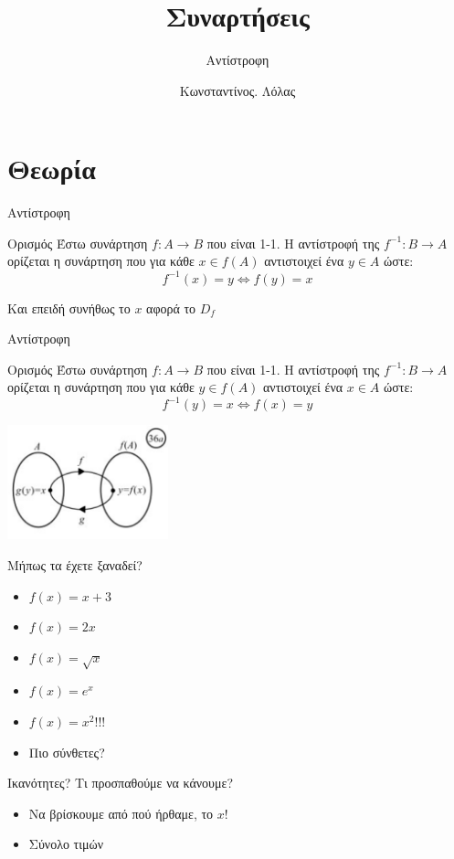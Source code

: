 \documentclass[greek]{beamer}
\title{Συναρτήσεις}
\subtitle{Αντίστροφη}
\author[Λόλας]{Κωνσταντίνος. Λόλας}
\date{}
\begin{document}
\begin{frame}
 \titlepage
\end{frame}

\section{Θεωρία}
\begin{frame}{Αντίστροφη}
 \begin{block}{Ορισμός}
  Έστω συνάρτηση  $f:Α\to B$ που είναι 1-1. Η αντίστροφή της $f^{-1}:Β\to Α$ ορίζεται η συνάρτηση που για κάθε $x\in f(Α)$ αντιστοιχεί ένα $y\in Α$ ώστε:
  $$f^{-1}(x)=y \iff f(y)=x$$
 \end{block} \pause
 Και επειδή συνήθως το $x$ αφορά το $D_f$
\end{frame}

\begin{frame}{Αντίστροφη}
 \begin{block}{Ορισμός}
  Έστω συνάρτηση  $f:Α\to B$ που είναι 1-1. Η αντίστροφή της $f^{-1}:Β\to Α$ ορίζεται η συνάρτηση που για κάθε $y\in f(Α)$ αντιστοιχεί ένα $x\in Α$ ώστε:
  $$f^{-1}(y)=x \iff f(x)=y$$
 \end{block}

 \centering
 \includegraphics[width=0.35\textwidth]{"images/1.3.4 Μονοτονία.png"}
\end{frame}

\begin{frame}{Μήπως τα έχετε ξαναδεί?}
 \begin{itemize}
  \item $f(x)=x+3$ \pause
  \item $f(x)=2x$ \pause
  \item $f(x)=\sqrt{x}$ \pause
  \item $f(x)=e^x$ \pause
  \item $f(x)=x^2$!!! \pause
  \item Πιο σύνθετες?
 \end{itemize}
\end{frame}

\begin{frame}{Ικανότητες?}
 Τι προσπαθούμε να κάνουμε? \pause
 \begin{itemize}
  \item Να βρίσκουμε από πού ήρθαμε, το $x$! \pause
  \item Σύνολο τιμών
 \end{itemize}
\end{frame}
\end{document}
